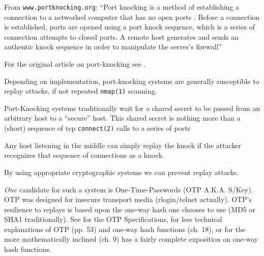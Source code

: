 \documentclass[landscape,twocolumn,headrule]{foils}
\begin{document}

\raggedright
From \texttt{www.portknocking.org}\cite{portknockingorg}: ``Port knocking is a method of establishing a connection to a networked computer that has no open ports   . Before a connection is established, ports are opened using a port knock sequence, which is a series of connection attempts to closed ports. A remote host generates and sends an authentic knock sequence in order to manipulate the server's firewall''

For the original article on port-knocking see \cite{portknocking-general}.


Depending on implementation, port-knocking systems are generally susceptible to replay attacks, if not repeated \texttt{nmap(1)} scanning. 

Port-Knocking systems traditionally wait for a shared secret to be passed from an arbitrary host to a ``secure'' host.  This shared secret is nothing more than a (short) sequence of tcp \texttt{connect(2)} calls to a series of ports 


\raggedright
Any host listening in the middle can simply replay the knock if the attacker recognizes that sequence of connections as a knock.


By using appropriate cryptographic systems we can prevent replay attacks.  

\emph{One} candidate for such a system is One-Time-Passwords (OTP A.K.A. S/Key).  OTP was designed for insecure transport media (rlogin/telnet actually).  OTP's resilience to replays is based  upon the one-way hash one chooses to use (MD5 or SHA1 traditionally).   See \cite{rfc2289} for the OTP Specifications, \cite{appliedcrypto} for less technical explanations of OTP (pp. 53) and one-way hash functions (ch. 18), or for the more mathematically inclined \cite{handbookappliedcrypto} (ch. 9) has a fairly complete exposition on one-way hash functions.
\end{document}
